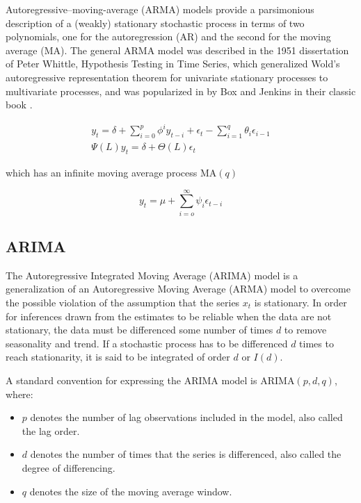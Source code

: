 \documentclass[
  11pt,
]{article}
\begin{document}
Autoregressive--moving-average (ARMA) models provide a parsimonious
description of a (weakly) stationary stochastic process in terms of two
polynomials, one for the autoregression (AR) and the second for the
moving average (MA). The general ARMA model was described in the 1951
dissertation of Peter Whittle, Hypothesis Testing in Time Series, which
generalized Wold's autoregressive representation theorem for univariate
stationary processes to multivariate processes, and was popularized in
by Box and Jenkins in their classic book \cite{box70}.

\begin{gather*}
y_{t} = \delta + \sum\limits_{i=0}^{p}\phi^{i}y_{t- i} + \epsilon_{t} - \sum\limits_{i=1}^{q}\theta_{i}\epsilon_{i-1} \\[8pt]
\Psi(L)y_{t} = \delta + \Theta(L)\epsilon_{t} 
\end{gather*}

which has an infinite moving average process \(\mathrm{MA}(q)\)

\[
y_{t} = \mu + \sum\limits_{i= o}^{\infty}\psi_{i}\epsilon_{t-i}
\]

\hypertarget{arima}{%
\subsection{ARIMA}\label{arima}}

The Autoregressive Integrated Moving Average (ARIMA) model is a
generalization of an Autoregressive Moving Average (ARMA) model to
overcome the possible violation of the assumption that the series
\(x_{t}\) is stationary. In order for inferences drawn from the
estimates to be reliable when the data are not stationary, the data must
be differenced some number of times \(d\) to remove seasonality and
trend. If a stochastic process has to be differenced \(d\) times to
reach stationarity, it is said to be integrated of order \(d\) or
\(I(d)\).

A standard convention for expressing the ARIMA model is
\(\mathrm{ARIMA}(p, d, q)\), where:

\begin{itemize}
\item
  \(p\) denotes the number of lag observations included in the model,
  also called the lag order.
\item
  \(d\) denotes the number of times that the series is differenced, also
  called the degree of differencing.
\item
  \(q\) denotes the size of the moving average window.
\end{itemize}
\end{document}
